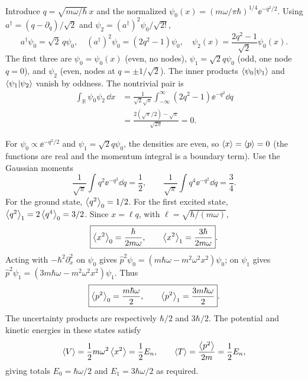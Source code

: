 Introduce $q=\sqrt{m\omega/\hbar}\,x$ and the normalized
$\psi_0(x)=(m\omega/\pi\hbar)^{1/4}\ee^{-q^2/2}$.
Using
$a^\dagger=(q-\partial_q)/\sqrt2$ and
$\psi_2=(a^\dagger)^2\psi_0/\sqrt{2!}$,
\begin{equation}
a^\dagger\psi_0=\sqrt2\,q\psi_0,\quad
(a^\dagger)^2\psi_0=(2q^2-1)\psi_0,\quad
\boxed{\psi_2(x)=\frac{2q^2-1}{\sqrt2}\psi_0(x)}.
\end{equation}
The first three are $\psi_0=\psi_0(x)$ (even, no
nodes), $\psi_1=\sqrt2q\psi_0$ (odd, one node $q=0$), and
$\psi_2$ (even, nodes at $q=\pm1/\sqrt2$). The inner products
$\left\langle \psi_0|\psi_1\right\rangle$ and $\left\langle \psi_1|\psi_2\right\rangle$ vanish
by oddness. The nontrivial pair is
\begin{align}
\int_{\mathbb R}\psi_0\psi_2\,\dd x
&=\frac1{\sqrt2\sqrt\pi}
\int_{-\infty}^\infty(2q^2-1)\ee^{-q^2}\dd q\\
&=\frac{2(\sqrt\pi/2)-\sqrt\pi}{\sqrt{2\pi}}=0.
\end{align}

For $\psi_0\propto\ee^{-q^2/2}$ and
$\psi_1=\sqrt2q\psi_0$, the densities are even, so
$\left\langle x\right\rangle=\left\langle p\right\rangle=0$ (the functions are real and the
momentum integral is a boundary term).
Use the Gaussian moments
\begin{equation}
\frac1{\sqrt\pi}\int q^2\ee^{-q^2}\dd q=\frac12,\qquad
\frac1{\sqrt\pi}\int q^4\ee^{-q^2}\dd q=\frac34.
\end{equation}
For the ground state, $\left\langle q^2\right\rangle_0=1/2$.
For the first excited state,
$\left\langle q^2\right\rangle_1=2\left\langle q^4\right\rangle_0=3/2$. Since
$x=\ell q$, with $\ell=\sqrt{\hbar/(m\omega)}$,
\begin{equation}
\boxed{\left\langle x^2\right\rangle_0=\frac{\hbar}{2m\omega},\qquad
\left\langle x^2\right\rangle_1=\frac{3\hbar}{2m\omega}}.
\end{equation}
Acting with $-\hbar^2\partial_x^2$ on $\psi_0$ gives
$\hat p^2\psi_0=(m\hbar\omega-m^2\omega^2x^2)\psi_0$;
on $\psi_1$ gives
$\hat p^2\psi_1=(3m\hbar\omega-m^2\omega^2x^2)\psi_1$.
Thus
\begin{equation}
\boxed{\left\langle p^2\right\rangle_0=\frac{m\hbar\omega}{2},\qquad
\left\langle p^2\right\rangle_1=\frac{3m\hbar\omega}{2}}.
\end{equation}
The uncertainty products are respectively
$\hbar/2$ and $3\hbar/2$. The potential and
kinetic energies in these states satisfy
\begin{equation}
\left\langle V\right\rangle=\frac12m\omega^2\left\langle x^2\right\rangle=\frac12 E_n,\qquad
\left\langle T\right\rangle=\frac{\left\langle p^2\right\rangle}{2m}=\frac12 E_n,
\end{equation}
giving totals $E_0=\hbar\omega/2$ and
$E_1=3\hbar\omega/2$ as required.


